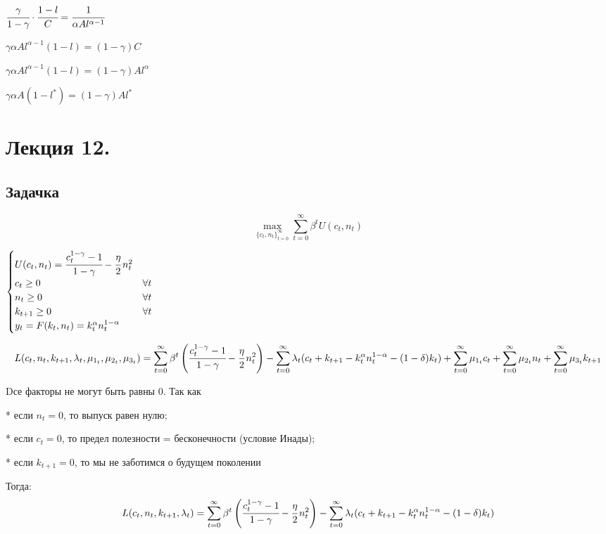 \documentclass[reqno]{article}
\theoremstyle{definition}
\theoremstyle{definition}
\theoremstyle{definition}
\theoremstyle{definition}
\theoremstyle{definition}
\theoremstyle{definition}
\theoremstyle{definition}
\theoremstyle{definition}
\theoremstyle{definition}
\begin{document}
	$\cfrac{\gamma}{1-\gamma} \cdot \cfrac{1-l}{C} = \cfrac{1}{\alpha A l^{\alpha - 1}}$
	
	$\gamma \alpha A l^{\alpha-1}(1-l)=(1-\gamma)C$
	
	$\gamma \alpha A l^{\alpha-1}(1-l)=(1-\gamma)Al^\alpha$
	
	$\gamma \alpha A (1-l^*)=(1-\gamma)Al^*$
	
	\newpage
	
	\section{Лекция 12.}
	
	\subsection{Задачка}
	
	$$\max_{\{c_t,n_t\}^\infty_{t=0}} \sum_{t=0}^\infty \beta^t U(c_t, n_t)$$
	
	$
	\begin{cases}
		U(c_t, n_t) = \cfrac{c_t^{1-\gamma}-1}{1-\gamma} - \cfrac{\eta}{2} \, n_t^2 & \\ 
		c_t \geq 0 & \forall t \\ 
		n_t \geq 0 & \forall t \\ 
		k_{t+1} \geq 0 & \forall t \\ 
		y_t = F(k_t,n_t)=k_t^\alpha n_t^{1-\alpha} & \\
	\end{cases}
	$
	
	$$L(c_t,n_t,k_{t+1},\lambda_t,\mu_{1_t}, \mu_{2_t},\mu_{3_t})=\sum_{t=0}^\infty \beta^t \left( \cfrac{c_t^{1-\gamma}-1}{1-\gamma} - \cfrac{\eta}{2} \, n_t^2 \right) - \sum_{t=0}^\infty \lambda_t (c_t + k_{t+1} - k_t^\alpha n_t^{1-\alpha} - (1-\delta)k_t) + \sum_{t=0}^\infty \mu_{1_t} c_t + \sum_{t=0}^\infty \mu_{2_t} n_t + \sum_{t=0}^\infty \mu_{3_t} k_{t+1} $$
	
	Dсе факторы не могут быть равны 0. Так как 
	
	* если $n_t = 0$, то выпуск равен нулю; 
	
	* если $c_t=0$, то предел полезности = бесконечности (условие Инады);
	
	* если $k_{t+1}=0$, то мы не заботимся о будущем поколении
	
	Тогда: 
	$$L(c_t,n_t,k_{t+1},\lambda_t)=\sum_{t=0}^\infty \beta^t \left( \cfrac{c_t^{1-\gamma}-1}{1-\gamma} - \cfrac{\eta}{2} \, n_t^2 \right) - \sum_{t=0}^\infty \lambda_t (c_t + k_{t+1} - k_t^\alpha n_t^{1-\alpha} - (1-\delta)k_t)$$
	
\end{document}
